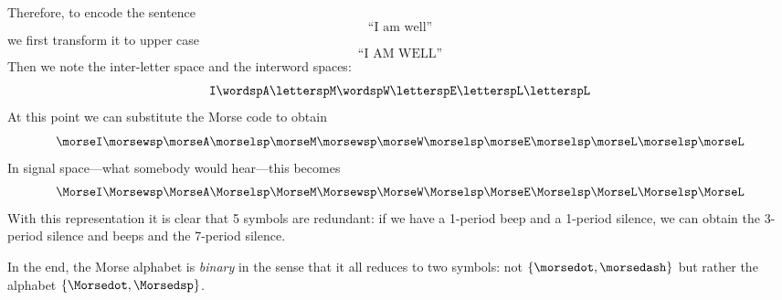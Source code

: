 \begin{example}
  Therefore, to encode the sentence
  \begin{equation}
  \text{``I am well''}
  \end{equation}
   we first transform it to upper case
   \begin{equation}
   \text{``I AM WELL''}
    \end{equation}
   Then we note the inter-letter space and the interword spaces:
  \begin{equation}
      \texttt{I} \wordsp \texttt{A} \lettersp \texttt{M} \wordsp \texttt{W} \lettersp
       \texttt{E} \lettersp \texttt{L} \lettersp \texttt{L}
  \end{equation}
  At this point we can substitute the Morse code to obtain
\begin{equation}
      \morseI \morsewsp \morseA \morselsp \morseM \morsewsp \morseW \morselsp \morseE \morselsp \morseL \morselsp \morseL
  \end{equation}
    In signal space---what somebody would hear---this becomes
\begin{equation}
      \MorseI \Morsewsp \MorseA \Morselsp \MorseM \Morsewsp \MorseW \Morselsp \MorseE \Morselsp \MorseL \Morselsp \MorseL
  \end{equation}
  With this representation it is clear that 5 symbols are redundant: if we have a 1-period beep and a 1-period silence, we can obtain the 3-period silence and beeps and the 7-period silence.

  In the end, the Morse alphabet is \emph{binary} in the sense that it all reduces to two symbols: not $\{\morsedot, \morsedash\}$ but rather the alphabet $\{\Morsedot, \Morsedsp\}$.

\end{example}
